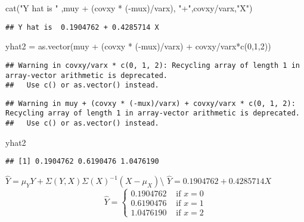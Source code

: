 \documentclass[
]{article}
\newenvironment{Shaded}{\begin{snugshade}}{\end{snugshade}}
\newcommand{\DecValTok}[1]{\textcolor[rgb]{0.00,0.00,0.81}{#1}}
\newcommand{\FunctionTok}[1]{\textcolor[rgb]{0.00,0.00,0.00}{#1}}
\newcommand{\NormalTok}[1]{#1}
\newcommand{\OtherTok}[1]{\textcolor[rgb]{0.56,0.35,0.01}{#1}}
\newcommand{\SpecialCharTok}[1]{\textcolor[rgb]{0.00,0.00,0.00}{#1}}
\newcommand{\StringTok}[1]{\textcolor[rgb]{0.31,0.60,0.02}{#1}}
\begin{document}
\begin{Shaded}
\begin{Highlighting}[]
\FunctionTok{cat}\NormalTok{(}\StringTok{"Y hat is "}\NormalTok{ ,muy }\SpecialCharTok{+}\NormalTok{ (covxy }\SpecialCharTok{*}\NormalTok{ (}\SpecialCharTok{{-}}\NormalTok{mux)}\SpecialCharTok{/}\NormalTok{varx), }\StringTok{"+"}\NormalTok{,covxy}\SpecialCharTok{/}\NormalTok{varx,}\StringTok{"X"}\NormalTok{)}
\end{Highlighting}
\end{Shaded}

\begin{verbatim}
## Y hat is  0.1904762 + 0.4285714 X
\end{verbatim}

\begin{Shaded}
\begin{Highlighting}[]
\NormalTok{yhat2 }\OtherTok{=} \FunctionTok{as.vector}\NormalTok{(muy }\SpecialCharTok{+}\NormalTok{ (covxy }\SpecialCharTok{*}\NormalTok{ (}\SpecialCharTok{{-}}\NormalTok{mux)}\SpecialCharTok{/}\NormalTok{varx) }\SpecialCharTok{+}\NormalTok{ covxy}\SpecialCharTok{/}\NormalTok{varx}\SpecialCharTok{*}\FunctionTok{c}\NormalTok{(}\DecValTok{0}\NormalTok{,}\DecValTok{1}\NormalTok{,}\DecValTok{2}\NormalTok{))}
\end{Highlighting}
\end{Shaded}

\begin{verbatim}
## Warning in covxy/varx * c(0, 1, 2): Recycling array of length 1 in array-vector arithmetic is deprecated.
##   Use c() or as.vector() instead.
\end{verbatim}

\begin{verbatim}
## Warning in muy + (covxy * (-mux)/varx) + covxy/varx * c(0, 1, 2): Recycling array of length 1 in array-vector arithmetic is deprecated.
##   Use c() or as.vector() instead.
\end{verbatim}

\begin{Shaded}
\begin{Highlighting}[]
\NormalTok{yhat2 }
\end{Highlighting}
\end{Shaded}

\begin{verbatim}
## [1] 0.1904762 0.6190476 1.0476190
\end{verbatim}

\(\hat{Y} = \mu_Y Y+\Sigma(Y,X)\Sigma(X)^{-1}(X-\mu_X)\)\textbackslash{}
\(\hat{Y} = 0.1904762 + 0.4285714 X\) \[\hat{Y}=\begin{cases}
0.1904762  & \text{ if } x= 0\\
0.6190476 & \text{ if } x= 1\\
1.0476190 & \text{ if } x= 2
\end{cases}\]
\end{document}
